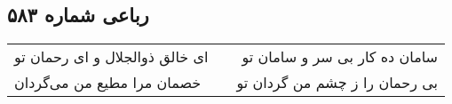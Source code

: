 \begin{center}
\section*{رباعی شماره ۵۸۳}
\label{sec:sh583}
\begin{longtable}{l p{0.5cm} r}
ای خالق ذوالجلال و ای رحمان تو
&&
سامان ده کار بی سر و سامان تو
\\
خصمان مرا مطیع من می‌گردان
&&
بی رحمان را ز چشم من گردان تو
\\
\end{longtable}
\end{center}
